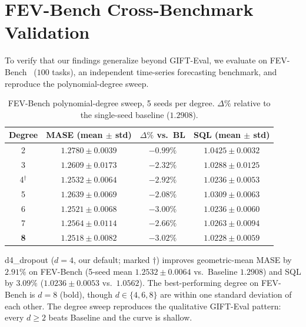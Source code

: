\documentclass[11pt]{article}
\theoremstyle{plain}
\theoremstyle{definition}
\theoremstyle{remark}
\newcommand{\HD}{\textsf{d4\_dropout}}
\begin{document}
\section{FEV-Bench Cross-Benchmark Validation}
\label{app:fevbench}

To verify that our findings generalize beyond GIFT-Eval, we evaluate on FEV-Bench~\citep{shchur2025fevbench} ($100$ tasks), an independent time-series forecasting benchmark, and reproduce the polynomial-degree sweep.

\begin{table}[h]
\centering
\caption{FEV-Bench polynomial-degree sweep, 5 seeds per degree. $\Delta\%$ relative to the single-seed baseline ($1.2908$).}
\small
\begin{tabular}{cccc}
\toprule
\textbf{Degree} & \textbf{MASE (mean $\pm$ std)} & \textbf{$\Delta\%$ vs.\ BL} & \textbf{SQL (mean $\pm$ std)} \\
\midrule
2 & $1.2780 \pm 0.0039$ & $-0.99\%$ & $1.0425 \pm 0.0032$ \\
3 & $1.2609 \pm 0.0173$ & $-2.32\%$ & $1.0288 \pm 0.0125$ \\
4$^\dagger$ & $1.2532 \pm 0.0064$ & $-2.92\%$ & $1.0236 \pm 0.0053$ \\
5 & $1.2639 \pm 0.0069$ & $-2.08\%$ & $1.0309 \pm 0.0063$ \\
6 & $1.2521 \pm 0.0068$ & $-3.00\%$ & $1.0236 \pm 0.0060$ \\
7 & $1.2564 \pm 0.0114$ & $-2.66\%$ & $1.0263 \pm 0.0094$ \\
\textbf{8} & $\mathbf{1.2518 \pm 0.0082}$ & $\mathbf{-3.02\%}$ & $\mathbf{1.0228 \pm 0.0059}$ \\
\bottomrule
\end{tabular}
\end{table}

\HD{} ($d=4$, our default; marked $\dagger$) improves geometric-mean MASE by $2.91\%$ on FEV-Bench (5-seed mean $1.2532 \pm 0.0064$ vs.\ Baseline $1.2908$) and SQL by $3.09\%$ ($1.0236 \pm 0.0053$ vs.\ $1.0562$). The best-performing degree on FEV-Bench is $d = 8$ (bold), though $d \in \{4, 6, 8\}$ are within one standard deviation of each other. The degree sweep reproduces the qualitative GIFT-Eval pattern: every $d \geq 2$ beats Baseline and the curve is shallow.
\end{document}
